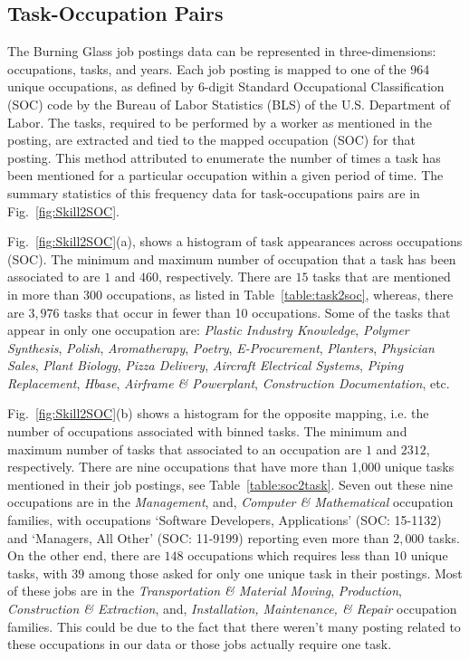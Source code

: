 \documentclass[letterpaper]{article} %
\begin{document}
\subsection{Task-Occupation Pairs}
\label{subsec:task-occ}
The Burning Glass job postings data can be represented in three-dimensions: occupations, tasks, and years. Each job posting is mapped to one of the 964 unique occupations, as defined by 6-digit Standard Occupational Classification (SOC) code by the Bureau of Labor Statistics (BLS) of the U.S. Department of Labor. The tasks, required to be performed by a worker as mentioned in the posting, are extracted and tied to the mapped occupation (SOC) for that posting. This method attributed to enumerate the number of times a task has been mentioned for a particular occupation within a given period of time. The summary statistics of this frequency data for task-occupations pairs are in Fig.~\ref{fig:Skill2SOC}.

Fig.~\ref{fig:Skill2SOC}(a), shows a histogram of task appearances across occupations (SOC). The minimum and maximum number of occupation that a task has been associated to are $1$ and $460$, respectively. There are $15$ tasks that are mentioned in more than $300$ occupations, as listed in Table~\ref{table:task2soc}, whereas, there are $3,976$ tasks that occur in fewer than 10 occupations. Some of the tasks that appear in only one occupation are:  {\it Plastic Industry Knowledge}, {\it Polymer Synthesis}, {\it Polish}, {\it Aromatherapy}, {\it Poetry}, {\it E-Procurement}, {\it Planters}, {\it Physician Sales}, {\it Plant Biology}, {\it Pizza Delivery}, {\it Aircraft Electrical Systems}, {\it Piping Replacement}, {\it Hbase}, {\it Airframe \& Powerplant}, {\it Construction Documentation}, etc.

Fig.~\ref{fig:Skill2SOC}(b) shows a histogram for the opposite mapping, i.e. the number of occupations associated with binned tasks. The minimum and maximum number of tasks that associated to an occupation are $1$ and $2312$, respectively. There are nine occupations that have more than 1,000 unique tasks mentioned in their job postings, see Table~\ref{table:soc2task}. Seven out these nine occupations are in the {\it Management}, and, {\it Computer \& Mathematical} occupation families, with occupations `Software Developers, Applications' (SOC: 15-1132) and `Managers, All Other' (SOC: 11-9199) reporting even more than $2,000$ tasks. On the other end, there are $148$ occupations which requires less than $10$ unique tasks, with $39$ among those asked for only one unique task in their postings. Most of these jobs are in the {\it Transportation \& Material Moving}, {\it Production}, {\it Construction \& Extraction}, and, {\it Installation, Maintenance, \& Repair} occupation families. This could be due to the fact that there weren't many posting related to these occupations in our data or those jobs actually require one task.
\end{document}
